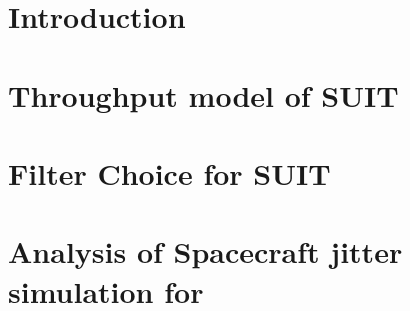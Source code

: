 
\section{Introduction}\label{secc3_intro}

\section{Throughput model of SUIT}\label{sec:suit_throughput}

\section{Filter Choice for SUIT}\label{sec:filter_choice}

\section{Analysis of Spacecraft jitter simulation for {\suit}}\label{sec:suit_cal}
